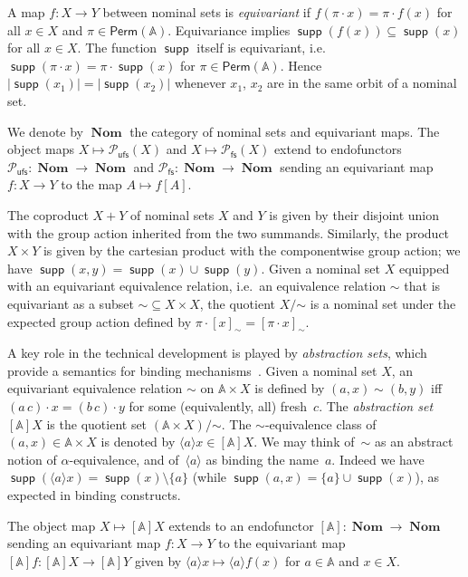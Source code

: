 \documentclass[final,a4paper,UKenglish,thm-restate,autoref,numberwithinsect]{lipics-v2021}
\renewcommand{\o}{\cdot}
\numberwithin{equation}{section}
\newcommand{\seq}{\subseteq}
\newcommand{\Perm}{\mathsf{Perm}}
\newcommand{\pow}{\mathcal{P}}
\newcommand{\braket}[1]{\langle #1 \rangle}
\newcommand{\fs}{\mathsf{fs}}
\newcommand{\+}[1]{\mathcal{#1}\xspace}
\newcommand{\Pow}{\mathcal{P}}
\newcommand{\ufs}{{\mathsf{ufs}}}
\DeclareMathOperator{\Nom}{\mathbf{Nom}}
\newcommand{\names}{\mathbb{A}}
\DeclareMathOperator{\supp}{\mathsf{supp}} %
\newcommand{\powfs}{\pow_{\fs}}
\theoremstyle{definition}
\begin{document}
A map $f\colon X\to Y$ between nominal sets is \emph{equivariant} if $f(\pi\o x)=\pi\o f(x)$ for all $x\in X$ and $\pi\in \Perm(\names)$. Equivariance implies $\supp(f(x))\seq \supp(x)$ for all $x\in X$. The function $\supp$ itself is
equivariant, i.e.~$\supp(\pi\cdot x)=\pi\cdot \supp(x)$ for
$\pi\in \Perm(\names)$.  Hence $|\supp(x_1)| = |\supp(x_2)|$ whenever $x_1$, $x_2$
are in the same orbit of a nominal set. 

We denote by $\Nom$ the category of nominal sets and equivariant maps. The object maps $X\mapsto \Pow_\ufs(X)$ and $X\mapsto \powfs(X)$ extend to endofunctors $\Pow_\ufs\colon \Nom\to \Nom$ and $\powfs\colon \Nom\to \Nom$
sending an equivariant map $f\colon X\to Y$ to the map $A\mapsto f[A]$. 

The coproduct $X+Y$ of nominal sets $X$ and $Y$ is given by their disjoint union with the group action inherited from the two summands. Similarly, the product $X \times Y$ is given by the cartesian product with the componentwise group action; we have $\supp(x,y)
= \supp(x) \cup \supp(y)$. Given a nominal set $X$ equipped with an
equivariant equivalence relation, i.e.~an equivalence relation $\sim$ that is equivariant as a 
subset $\mathord{\sim} \subseteq X \times X$, the quotient
$X/\mathord{\sim}$ is a nominal set under the expected group action
defined by $\pi \cdot [x]_\sim = [\pi \cdot x]_\sim$.

A key role in the technical development is played by
\emph{abstraction sets}, which provide a semantics for binding
mechanisms~\cite{GabbayPitts99}. Given a nominal set $X$, an equivariant equivalence relation $\sim$ on
  $\names \times X$ is defined by $(a,x)\sim (b,y)$ iff
  $(a\, c)\cdot x=(b\, c)\cdot y$ for some (equivalently, all)
  fresh~$c$. The \emph{abstraction set} $[\names]X$ is the quotient
  set $(\names\times X)/\mathord{\sim}$. The $\sim$-equivalence class
  of $(a,x)\in\names\times X$ is denoted by
  $\braket{a} x\in [\names]X$. We may think of~$\sim$ as an abstract notion of $\alpha$-equivalence,
and of~$\braket{a}$ as binding the name~$a$. Indeed we have
$\supp(\braket{a} x)= \supp(x)\setminus\{a\}$ (while
$\supp(a,x)=\{a\}\cup\supp(x)$), as expected in binding constructs.

 The object map $X\mapsto [\names]X$ extends to an endofunctor
$[\names]\colon \Nom \to \Nom$
sending an equivariant map $f\colon X\to Y$ to the equivariant map $[\names]f\colon [\names]X\to [\names]Y$ given by $\braket{a}x\mapsto \braket{a}f(x)$ for $a\in \names$ and $x\in X$.
\end{document}
